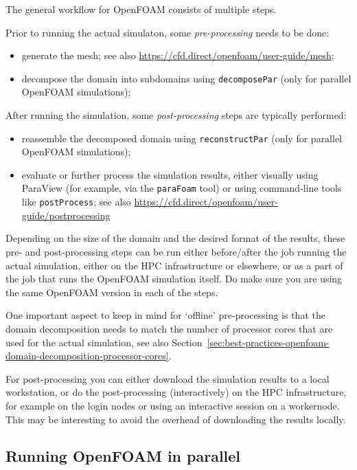 The general workflow for OpenFOAM consists of multiple steps.

Prior to running the actual simulaton, some \textit{pre-processing} needs to be done:

\begin{itemize}
\item generate the mesh; see also {\small\url{https://cfd.direct/openfoam/user-guide/mesh}};
\item decompose the domain into subdomains using {\small\texttt{decomposePar}} (only for parallel OpenFOAM simulations);
\end{itemize}

After running the simulation, some \textit{post-processing} steps are typically performed:

\begin{itemize}
\item reassemble the decomposed domain using {\small\texttt{reconstructPar}} (only for parallel OpenFOAM simulations);
\item evaluate or further process the simulation results, either visually using ParaView
      (for example, via the {\small\texttt{paraFoam}} tool) or using command-line tools like {\small\texttt{postProcess}};
      see also {\small\url{https://cfd.direct/openfoam/user-guide/postprocessing}}

\end{itemize}

Depending on the size of the domain and the desired format of the results, these pre- and post-processing
steps can be run either before/after the job running the actual simulation, either on the HPC infrastructure
or elsewhere, or as a part of the job that runs the OpenFOAM simulation itself.
Do make sure you are using the same OpenFOAM version in each of the steps.

One important aspect to keep in mind for `offline' pre-processing is that the domain decomposition needs to match
the number of processor cores that are used for the actual simulation,
see also Section~\ref{sec:best-practices-openfoam-domain-decomposition-processor-cores}.

For post-processing you can either download the simulation results to a local workstation,
or do the post-processing (interactively) on the HPC infrastructure, for example on the login nodes
or using an interactive session on a workernode. This may be interesting to avoid the overhead of
downloading the results locally.


\subsection{Running OpenFOAM in parallel}


